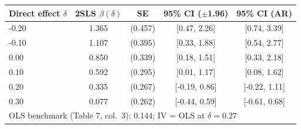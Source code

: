 \begin{tabular}{lcccc}
\toprule
Direct effect $\delta$ & 2SLS $\beta(\delta)$ & SE & 95\% CI ($\pm$1.96) & 95\% CI (AR) \\
\midrule
-0.20 & 1.365 & (0.457) & [0.47, 2.26] & [0.74, 3.39] \\
-0.10 & 1.107 & (0.395) & [0.33, 1.88] & [0.54, 2.77] \\
0.00 & 0.850 & (0.339) & [0.18, 1.51] & [0.33, 2.18] \\
0.10 & 0.592 & (0.295) & [0.01, 1.17] & [0.08, 1.62] \\
0.20 & 0.335 & (0.267) & [-0.19, 0.86] & [-0.22, 1.11] \\
0.30 & 0.077 & (0.262) & [-0.44, 0.59] & [-0.61, 0.68] \\
\midrule
\multicolumn{5}{l}{OLS benchmark (Table 7, col.\ 3): 0.144; IV = OLS at $\delta = 0.27$} \\
\bottomrule
\end{tabular}
